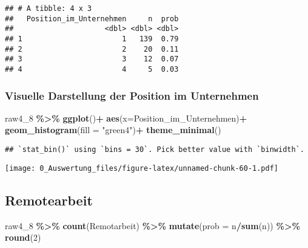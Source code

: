 \documentclass[
]{article}
\newenvironment{Shaded}{\begin{snugshade}}{\end{snugshade}}
\newcommand{\AttributeTok}[1]{\textcolor[rgb]{0.13,0.29,0.53}{#1}}
\newcommand{\DecValTok}[1]{\textcolor[rgb]{0.00,0.00,0.81}{#1}}
\newcommand{\FunctionTok}[1]{\textcolor[rgb]{0.13,0.29,0.53}{\textbf{#1}}}
\newcommand{\NormalTok}[1]{#1}
\newcommand{\SpecialCharTok}[1]{\textcolor[rgb]{0.81,0.36,0.00}{\textbf{#1}}}
\newcommand{\StringTok}[1]{\textcolor[rgb]{0.31,0.60,0.02}{#1}}
\begin{document}
\begin{verbatim}
## # A tibble: 4 x 3
##   Position_im_Unternehmen     n  prob
##                     <dbl> <dbl> <dbl>
## 1                       1   139  0.79
## 2                       2    20  0.11
## 3                       3    12  0.07
## 4                       4     5  0.03
\end{verbatim}

\subsubsection{Visuelle Darstellung der Position im
Unternehmen}\label{visuelle-darstellung-der-position-im-unternehmen}

\begin{Shaded}
\begin{Highlighting}[]
\NormalTok{raw4\_8 }\SpecialCharTok{\%\textgreater{}\%} 
  \FunctionTok{ggplot}\NormalTok{()}\SpecialCharTok{+}
  \FunctionTok{aes}\NormalTok{(}\AttributeTok{x=}\NormalTok{Position\_im\_Unternehmen)}\SpecialCharTok{+}
  \FunctionTok{geom\_histogram}\NormalTok{(}\AttributeTok{fill =} \StringTok{"green4"}\NormalTok{)}\SpecialCharTok{+}
  \FunctionTok{theme\_minimal}\NormalTok{()}
\end{Highlighting}
\end{Shaded}

\begin{verbatim}
## `stat_bin()` using `bins = 30`. Pick better value with `binwidth`.
\end{verbatim}

\texttt{[image: 0\_Auswertung\_files/figure-latex/unnamed-chunk-60-1.pdf]}

\subsection{Remotearbeit}\label{remotearbeit}

\begin{Shaded}
\begin{Highlighting}[]
\NormalTok{raw4\_8 }\SpecialCharTok{\%\textgreater{}\%} 
  \FunctionTok{count}\NormalTok{(Remotarbeit) }\SpecialCharTok{\%\textgreater{}\%} 
  \FunctionTok{mutate}\NormalTok{(}\AttributeTok{prob =}\NormalTok{ n}\SpecialCharTok{/}\FunctionTok{sum}\NormalTok{(n)) }\SpecialCharTok{\%\textgreater{}\%} 
  \FunctionTok{round}\NormalTok{(}\DecValTok{2}\NormalTok{)}
\end{Highlighting}
\end{Shaded}
\end{document}
